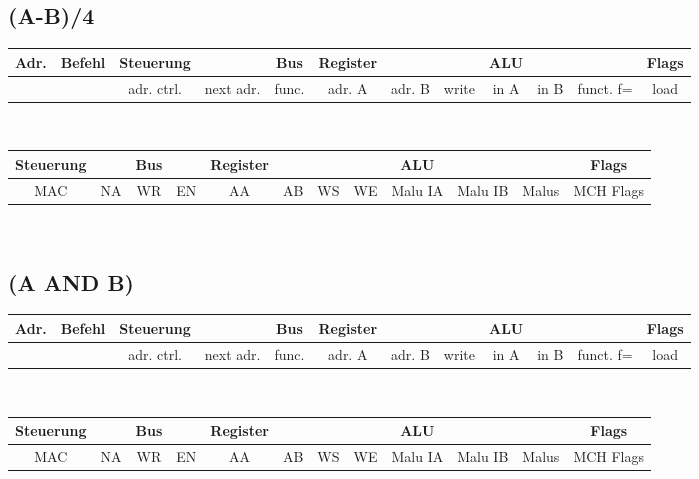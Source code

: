 \documentclass[paper=a4, fontsize=11pt]{scrartcl}
\numberwithin{equation}{section}
\numberwithin{figure}{section}
\numberwithin{table}{section}
\begin{document}

\subsection{(A-B)/4}

\begin{tabular}{|c|c|cc|c|ccc|ccc|c|}
\hline
Adr. & Befehl &Steuerung & & Bus & Register & & & ALU & & & Flags \\
\hline
& & adr. ctrl. & next adr. & func. & adr. A & adr. B & write & in A & in B & funct. f= & load \\
\hline
\end{tabular} \\

\begin{tabular}{|cc|cc|cccc|ccc|c|}
\hline
Steuerung & & Bus & & Register & & & & ALU & & & Flags \\
\hline
MAC & NA & WR & EN & AA & AB & WS & WE & Malu IA & Malu IB & Malus & MCH Flags \\
\hline
\end{tabular} \\


\subsection{(A AND B)}

\begin{tabular}{|c|c|cc|c|ccc|ccc|c|}
\hline
Adr. & Befehl &Steuerung & & Bus & Register & & & ALU & & & Flags \\
\hline
& & adr. ctrl. & next adr. & func. & adr. A & adr. B & write & in A & in B & funct. f= & load \\
\hline
\end{tabular} \\

\begin{tabular}{|cc|cc|cccc|ccc|c|}
\hline
Steuerung & & Bus & & Register & & & & ALU & & & Flags \\
\hline
MAC & NA & WR & EN & AA & AB & WS & WE & Malu IA & Malu IB & Malus & MCH Flags \\
\hline
\end{tabular} \\

\end{document}
